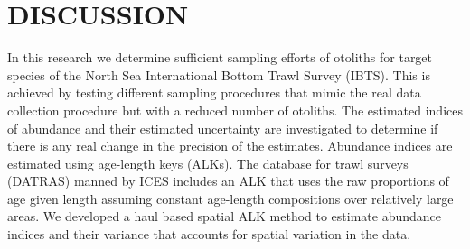 \documentclass[a4paper 12pt]{article}
\numberwithin{equation}{section}
\newcommand{\ed}[1]{\textcolor{red}{#1}}
\begin{document}
\clearpage
\section{DISCUSSION}
\label{sec:discussion}

In this research we determine sufficient sampling efforts of otoliths for target species of the North Sea International Bottom Trawl Survey (IBTS). This is achieved by testing different sampling procedures that mimic the real data collection procedure but with a reduced number of otoliths. The estimated indices of abundance and their estimated uncertainty are investigated to determine if there is any real change in the precision of the estimates. Abundance indices are estimated using age-length keys (ALKs). The database for trawl surveys (DATRAS) manned by ICES includes an ALK that uses the raw proportions of age given length assuming constant age-length compositions over relatively large areas. We developed a haul based spatial ALK method  to estimate abundance indices and their variance that accounts for spatial variation in the data. 


%
\end{document}
